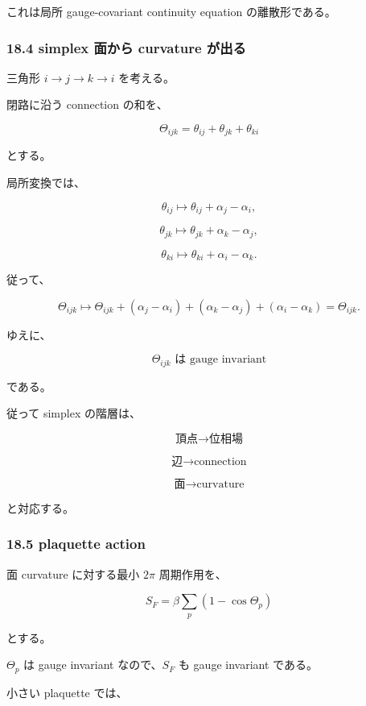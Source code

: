 \documentclass[
  a4paper,
]{ltjsarticle}
\begin{document}
これは局所 gauge-covariant continuity equation の離散形である。

\subsubsection{18.4 simplex 面から curvature
が出る}\label{simplex-ux9762ux304bux3089-curvature-ux304cux51faux308b}

三角形 \(i\to j\to k\to i\) を考える。

閉路に沿う connection の和を、

\[
\boxed{
\Theta_{ijk}
=
\theta_{ij}
+
\theta_{jk}
+
\theta_{ki}
}
\tag{77}
\]

とする。

局所変換では、

\[
\theta_{ij}
\mapsto
\theta_{ij}+\alpha_j-\alpha_i,
\]

\[
\theta_{jk}
\mapsto
\theta_{jk}+\alpha_k-\alpha_j,
\]

\[
\theta_{ki}
\mapsto
\theta_{ki}+\alpha_i-\alpha_k.
\]

従って、

\[
\Theta_{ijk}
\mapsto
\Theta_{ijk}
+
(\alpha_j-\alpha_i)
+
(\alpha_k-\alpha_j)
+
(\alpha_i-\alpha_k)
=
\Theta_{ijk}.
\]

ゆえに、

\[
\boxed{
\Theta_{ijk}
\text{ は gauge invariant}
}
\tag{78}
\]

である。

従って simplex の階層は、

\[
\boxed{
\text{頂点}
\to
\text{位相場}
}
\]

\[
\boxed{
\text{辺}
\to
\text{connection}
}
\]

\[
\boxed{
\text{面}
\to
\text{curvature}
}
\tag{79}
\]

と対応する。

\subsubsection{18.5 plaquette action}\label{plaquette-action}

面 curvature に対する最小 \(2\pi\) 周期作用を、

\[
\boxed{
S_F
=
\beta
\sum_p
\left(
1-\cos\Theta_p
\right)
}
\tag{80}
\]

とする。

\(\Theta_p\) は gauge invariant なので、\(S_F\) も gauge invariant
である。

小さい plaquette では、
\end{document}

